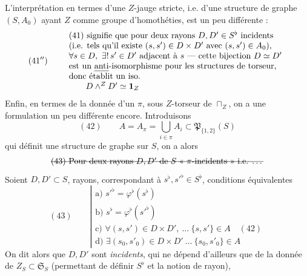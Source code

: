 \documentclass[11pt,a4paper]{article}
\begin{document}
L'interprétation en termes d'une \struck{\ill{}} $Z$-jauge stricte, i.e. d'une structure de graphe $(S, A_0)$ ayant $Z$ comme groupe d'homothéties, est un peu différente :
\[
(41'') \qquad
\begin{array}{l}
\text{(41) signifie que pour deux rayons } D, D' \in S^{\flat} \text{ incidents} \\
\text{(i.e. tels qu'il existe } (s,s') \in D \times D' \text{ avec } (s,s') \in A_0\text{),} \\
\forall s \in D, \ \exists!\, s' \in D' \text{ adjacent à } s \text{ --- cette bijection } D \simeq D' \\
\text{est un \emph{anti}-isomorphisme pour les structures de torseur,} \\
\text{donc établit un iso.} \\
\qquad D \wedge^{Z} D' \simeq \mathbf{1}_Z
\end{array}
\]
Enfin, en termes de la donnée d'un $\pi$, sous $Z$-torseur de $\sqcap_Z$, on a une formulation un peu différente encore. Introduisons
\[
(42) \qquad A = A_{\pi} = \bigcup_{i \in \pi} A_i \subset \mathfrak{P}_{\{1,2\}}(S)
\]
qui définit une structure de graphe sur $S$, on a alors
\[
\text{\struck{(43) Pour deux rayons $D, D'$ de $S$ « $\pi$-incidents » i.e. …}}
\]
Soient \struck{\ill{}} $D, D' \subset S$,  rayons, correspondant à $s^{\flat}, s'^{\flat} \in S^{\flat}$, conditions équivalentes
\[
(43) \qquad
\left|
\begin{array}{l}
\text{a) } s'^{\flat} = \varphi^{\flat}(s^{\flat}) \\
\text{b) } s^{\flat} = \varphi^{\flat}(s'^{\flat}) \\
\text{c) } \forall (s,s') \in D \times D', \ \ldots \ \{s,s'\} \in A \quad (42) \\
\text{d) } \exists (s_0, s'_0) \in D \times D' \ \ldots \ \{s_0, s'_0\} \in A
\end{array}
\right.
\]
On dit alors que $D, D'$ sont \add{$\pi$-}\emph{incidents}, \struck{\ill{}}  qui ne dépend d'ailleurs que de la donnée de $Z_S \subset \mathfrak{S}_S$ (permettant de définir $S^{\flat}$ et la notion de rayon),
\end{document}
